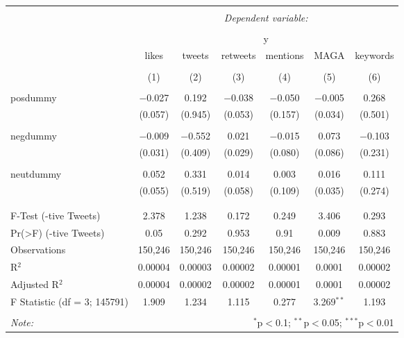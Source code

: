 
\begin{table}[!htbp] \centering 
  \caption{} 
  \label{} 
\begin{tabular}{@{\extracolsep{5pt}}lcccccc} 
\\[-1.8ex]\hline 
\hline \\[-1.8ex] 
 & \multicolumn{6}{c}{\textit{Dependent variable:}} \\ 
\cline{2-7} 
\\[-1.8ex] & \multicolumn{6}{c}{y} \\ 
 & likes & tweets & retweets & mentions & MAGA & keywords \\ 
\\[-1.8ex] & (1) & (2) & (3) & (4) & (5) & (6)\\ 
\hline \\[-1.8ex] 
 posdummy & $-$0.027 & 0.192 & $-$0.038 & $-$0.050 & $-$0.005 & 0.268 \\ 
  & (0.057) & (0.945) & (0.053) & (0.157) & (0.034) & (0.501) \\ 
  & & & & & & \\ 
 negdummy & $-$0.009 & $-$0.552 & 0.021 & $-$0.015 & 0.073 & $-$0.103 \\ 
  & (0.031) & (0.409) & (0.029) & (0.080) & (0.086) & (0.231) \\ 
  & & & & & & \\ 
 neutdummy & 0.052 & 0.331 & 0.014 & 0.003 & 0.016 & 0.111 \\ 
  & (0.055) & (0.519) & (0.058) & (0.109) & (0.035) & (0.274) \\ 
  & & & & & & \\ 
\hline \\[-1.8ex] 
F-Test (-tive Tweets) & 2.378 & 1.238 & 0.172 & 0.249 & 3.406 & 0.293 \\ 
Pr(>F) (-tive Tweets) & 0.05 & 0.292 & 0.953 & 0.91 & 0.009 & 0.883 \\ 
Observations & 150,246 & 150,246 & 150,246 & 150,246 & 150,246 & 150,246 \\ 
R$^{2}$ & 0.00004 & 0.00003 & 0.00002 & 0.00001 & 0.0001 & 0.00002 \\ 
Adjusted R$^{2}$ & 0.00004 & 0.00002 & 0.00002 & 0.00001 & 0.0001 & 0.00002 \\ 
F Statistic (df = 3; 145791) & 1.909 & 1.234 & 1.115 & 0.277 & 3.269$^{**}$ & 1.193 \\ 
\hline 
\hline \\[-1.8ex] 
\textit{Note:}  & \multicolumn{6}{r}{$^{*}$p$<$0.1; $^{**}$p$<$0.05; $^{***}$p$<$0.01} \\ 
\end{tabular} 
\end{table} 
